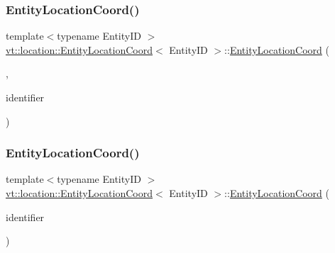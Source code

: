 \subsubsection{\texorpdfstring{Entity\+Location\+Coord()}{EntityLocationCoord()}\hspace{0.1cm}{\footnotesize\ttfamily [2/3]}}
{\footnotesize\ttfamily template$<$typename Entity\+ID $>$ \\
\hyperlink{structvt_1_1location_1_1_entity_location_coord}{vt\+::location\+::\+Entity\+Location\+Coord}$<$ Entity\+ID $>$\+::\hyperlink{structvt_1_1location_1_1_entity_location_coord}{Entity\+Location\+Coord} (\begin{DoxyParamCaption}\item[{\hyperlink{structvt_1_1location_1_1collection__lm__tag__t}{collection\+\_\+lm\+\_\+tag\+\_\+t}}]{,  }\item[{\hyperlink{namespacevt_1_1location_a4db6456e8024af2d23fc5ae560fef866}{Loc\+Inst\+Type}}]{identifier }\end{DoxyParamCaption})}

\mbox{\label{structvt_1_1location_1_1_entity_location_coord_a5dcddcc605ab3cd16d94161e895b88e3}} 
\subsubsection{\texorpdfstring{Entity\+Location\+Coord()}{EntityLocationCoord()}\hspace{0.1cm}{\footnotesize\ttfamily [3/3]}}
{\footnotesize\ttfamily template$<$typename Entity\+ID $>$ \\
\hyperlink{structvt_1_1location_1_1_entity_location_coord}{vt\+::location\+::\+Entity\+Location\+Coord}$<$ Entity\+ID $>$\+::\hyperlink{structvt_1_1location_1_1_entity_location_coord}{Entity\+Location\+Coord} (\begin{DoxyParamCaption}\item[{\hyperlink{namespacevt_1_1location_a4db6456e8024af2d23fc5ae560fef866}{Loc\+Inst\+Type} const}]{identifier }\end{DoxyParamCaption})\hspace{0.3cm}{\ttfamily [explicit]}}

